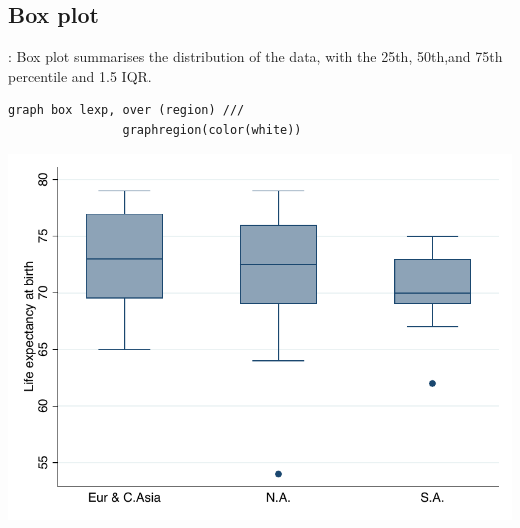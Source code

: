 \subsection{Box plot}
\begin{frame}[fragile]{\secname: \subsecname}
Box plot summarises the distribution of the data, with the 25th, 50th,and 75th percentile and 1.5 IQR.
\begin{verbatim}
graph box lexp, over (region) ///
                graphregion(color(white))\end{verbatim}

\begin{center}
	\includegraphics[scale=0.5]{images/box}
\end{center}
\end{frame}
